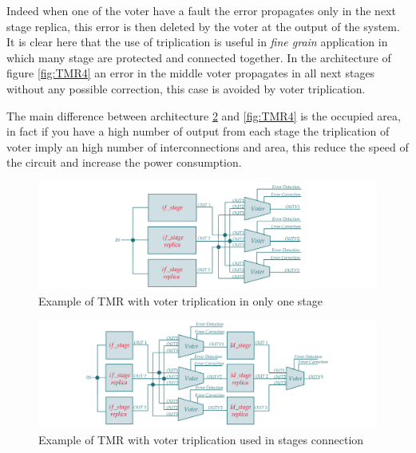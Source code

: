 {{{{{        		    
        		    Indeed when one of the voter have a fault the error propagates only in the next stage replica, this error is then deleted by the voter at the output of the system. 
        		    It is clear here that the use of triplication is useful in \textit{fine grain} application in which many stage are protected and connected together.
        		    In the architecture of figure \ref{fig:TMR4} an error in the middle voter propagates in all next stages without any possible correction, this case is avoided by voter triplication.
        		    
        		    The main difference between architecture \ref{fig:TMR3} and \ref{fig:TMR4} is the occupied area, in fact if you have a high number of output from each stage the triplication of voter imply an high number of interconnections and area, this reduce the speed of the circuit and increase the power consumption.
        		    
        		    \begin{figure}[H]
            			\centering
            			\includegraphics[scale=0.2,center]{./images/TMR_tripleVoter.png}
            			\caption{Example of TMR with voter triplication in only one stage}
            			\label{fig:TMR2}
            		\end{figure}
            		
            		\begin{figure}[H]
            			\centering
            			\includegraphics[scale=0.2,center]{./images/TMR_tripleVoter2.png}
            			\caption{Example of TMR with voter triplication used in stages connection}
            			\label{fig:TMR3}
            		\end{figure} 
            		
}}}}}
